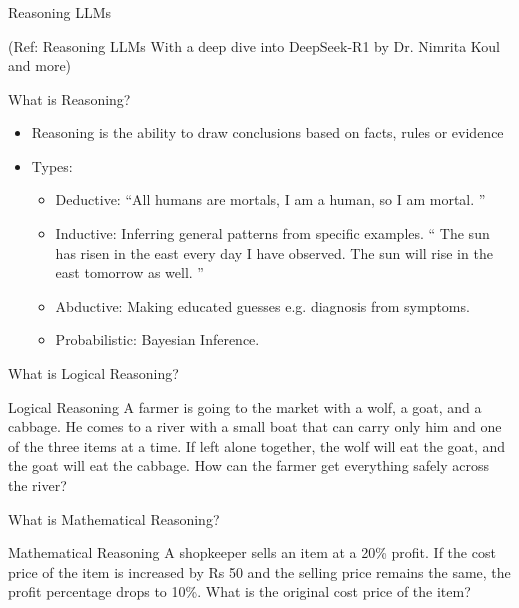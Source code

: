 \begin{frame}[fragile]\frametitle{}
\begin{center}
{\Large Reasoning LLMs}

{\tiny (Ref: Reasoning LLMs With a deep dive into DeepSeek-R1 by Dr. Nimrita Koul and more)}

\end{center}


\end{frame}

\begin{frame}[fragile]{What is Reasoning?}
    \begin{itemize}
        \item Reasoning is the ability to draw conclusions based on facts, rules or evidence
		\item Types:
			    \begin{itemize}
				\item  Deductive: ``All humans are mortals, I am a human, so I am mortal. ''
				\item  Inductive: Inferring general patterns from specific examples. `` The sun has risen in the east every day I have observed. The sun will rise in the east tomorrow as well. ''
				\item  Abductive: Making educated guesses e.g. diagnosis from symptoms.
				\item  Probabilistic: Bayesian Inference.
			\end{itemize}
    \end{itemize}
\end{frame}

\begin{frame}[fragile]{What is Logical Reasoning?}
    \begin{block}{Logical Reasoning}
		A farmer is going to the market with a wolf, a goat, 
		and a cabbage. He comes to a river with a small boat 
		that can carry only him and one of the three items at 
		a time. If left alone together, the wolf will eat the goat, 
		and the goat will eat the cabbage. How can the 
		farmer get everything safely across the river?
    \end{block}
\end{frame}

\begin{frame}[fragile]{What is Mathematical Reasoning?}
    \begin{block}{Mathematical Reasoning}
		 A shopkeeper sells an item at a 20\% profit. If the 
		cost price of the item is increased by Rs 50 and the 
		selling price remains the same, the profit 
		percentage drops to 10\%. What is the original cost 
		price of the item?
    \end{block}
\end{frame}

